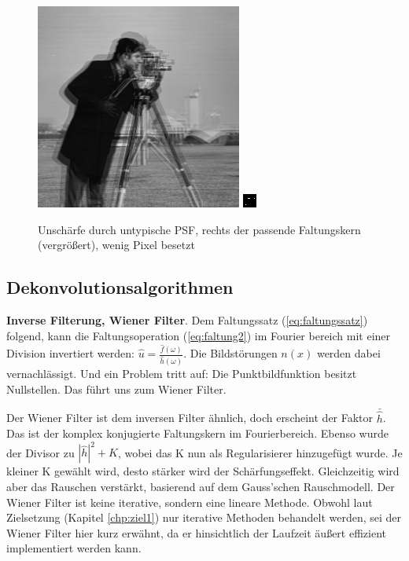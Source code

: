 \documentclass[a4paper,12pt]{article}
\begin{document}
\begin{figure}[htbp]
\centering
\includegraphics[scale=0.8]{out_krumm17.png}
\includegraphics[scale=5]{krumm17.png}
\caption{Unschärfe durch untypische PSF, rechts der passende Faltungskern
(vergrößert), wenig Pixel besetzt}%
\label{figure_duenn}
\end{figure}


 
\newpage
\subsection{Dekonvolutionsalgorithmen}\label{chp:algoritmen}

\textbf{Inverse Filterung, Wiener Filter}. 
Dem Faltungssatz (\ref{eq:faltungssatz}) folgend, kann die Faltungsoperation
(\ref{eq:faltung2}) im Fourier bereich mit einer Division invertiert werden:
$\hat u = \frac{\hat{f}(\omega)} {\hat{h}(\omega)}$. Die Bildstörungen $n(x)$
werden dabei vernachlässigt. Und ein Problem tritt auf:
Die Punktbildfunktion besitzt Nullstellen. Das führt uns zum Wiener Filter.

Der Wiener Filter\cite{wiener} ist dem inversen Filter ähnlich, doch erscheint
der Faktor $\bar{\hat{h}}$. Das ist der komplex konjugierte Faltungskern im
Fourierbereich. Ebenso wurde der Divisor zu $|\hat{h}|^{2}+K$, wobei das K nun
als Regularisierer hinzugefügt wurde. Je kleiner K gewählt wird, desto stärker
wird der Schärfungseffekt. Gleichzeitig wird aber das Rauschen verstärkt,
basierend auf dem Gauss'schen Rauschmodell.
Der Wiener Filter ist keine iterative, sondern eine lineare Methode. 
Obwohl laut Zielsetzung (Kapitel \ref{chp:ziel1}) nur iterative Methoden behandelt
werden, sei der Wiener Filter hier kurz erwähnt, 
da er hinsichtlich der Laufzeit äußert
effizient implementiert werden kann. 
\end{document}
